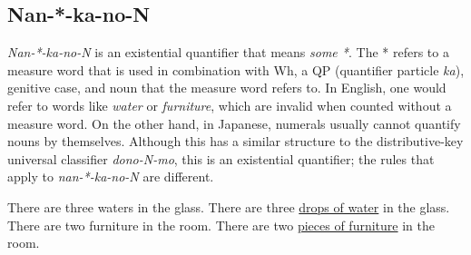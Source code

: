 \documentclass[english, 11pt]{article}
\begin{document}
\subsection{Nan-*-ka-no-N}
\emph{Nan-*-ka-no-N} is an existential quantifier that means \emph{some *}. The * refers to a measure word that is used in combination with Wh, a QP (quantifier particle \emph{ka}), genitive case, and noun that the measure word refers to. In English, one would refer to words like \emph{water} or \emph{furniture}, which are invalid when counted without a measure word. On the other hand, in Japanese, numerals usually cannot quantify nouns by themselves. Although this has a similar structure to the distributive-key universal classifier \emph{dono-N-mo}, this is an existential quantifier; the rules that apply to \emph{nan-*-ka-no-N} are different. 
\begin {exe}
	\ex 
		\begin {xlist}
			\ex *There are three waters in the glass.
			\ex There are three \underline{drops of water} in the glass.
			\ex *There are two furniture in the room.
			\ex There are two \underline{pieces of furniture} in the room.
	\end {xlist}
\end {exe}
\begin{exe}
	\ex 
	\begin{xlist}
		\label{1a}
		\label{1b}
	\end{xlist}
\end{exe}
\end{document}

